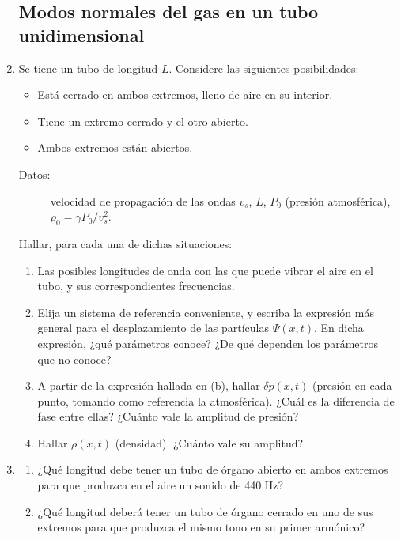 \documentclass[11pt,spanish,a4paper]{article}
\begin{document}
\begin{enumerate}
\subsection*{Modos normales del gas en un tubo unidimensional}

\item Se tiene un tubo de longitud $L$. Considere las siguientes posibilidades: 

\begin{itemize}
\item Está cerrado en ambos extremos, lleno de aire en su interior.
\item Tiene un extremo cerrado y el otro abierto. 
\item Ambos extremos están abiertos. \end{itemize}
\begin{description}
\item [{Datos:}] velocidad de propagación de las ondas $v_{s}$, $L$,
$P_{0}$ (presión atmosférica), $\rho_{0}=\gamma P_{0}/v_{s}^{2}$.
\end{description}

Hallar, para cada una de dichas situaciones: 
\begin{enumerate}
\item Las posibles longitudes de onda con las que puede vibrar el aire en
el tubo, y sus correspondientes frecuencias. 
\item Elija un sistema de referencia conveniente, y escriba la expresión
más general para el desplazamiento de las partículas $\Psi(x,t)$.
En dicha expresión, ¿qué parámetros conoce? ¿De qué dependen los parámetros
que no conoce? 
\item A partir de la expresión hallada en (b), hallar $\delta p(x,t)$ (presión
en cada punto, tomando como referencia la atmosférica). ¿Cuál es la
diferencia de fase entre ellas? ¿Cuánto vale la amplitud de presión? 
\item Hallar $\rho(x,t)$ (densidad). ¿Cuánto vale su amplitud?
\end{enumerate}



\item 
\begin{enumerate}
\item ¿Qué longitud debe tener un tubo de órgano abierto en ambos extremos
para que produzca en el aire un sonido de 440 Hz? 
\item ¿Qué longitud deberá tener un tubo de órgano cerrado en uno de sus
extremos para que produzca el mismo tono en su primer armónico?
\end{enumerate}



\end{enumerate}
\end{document}
